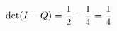 \documentclass[preview]{standalone}
\begin{document}
\begin{align*}
\special{dvisvgm:raw <g id='unique000'>}\det(I-Q)=\dfrac{1}{2}-\dfrac{1}{4}=\dfrac{1}{4}\special{dvisvgm:raw </g>}
\end{align*}
\end{document}
